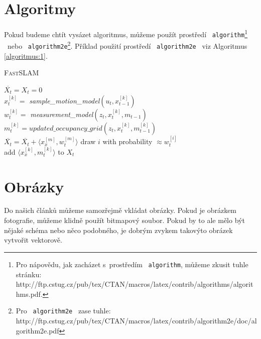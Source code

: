 \documentclass[11pt,a4paper,titlepage]{article}
\begin{document}
\section{Algoritmy} \label{section:3}
Pokud budeme chtít vysázet algoritmus, můžeme použít prostředí \ \texttt{algorithm}\footnote{Pro nápovědu, jak zacházet s~prostředím \ 
\texttt{algorithm}, můžeme zkusit tuhle stránku:\\ http://ftp.cstug.cz/pub/tex/CTAN/macros/latex/contrib/algorithms/algorithms.pdf.}
\ nebo \ \texttt{algorithm2e}\footnote{Pro \ \texttt{algorithm2e} \ zase tuhle: http://ftp.cstug.cz/pub/tex/CTAN/macros/latex/contrib/algorithm2e/doc/algorithm2e.pdf}. Příklad použití prostředí \ \texttt{algorithm2e} \ viz Algoritmus \ref{algoritmus:1}.

\bigskip
\begin{algorithm}[H]
\caption{\textsc{Fast}SLAM}
\label{algoritmus:1}
\SetNlSty{}{}{:}
\SetInd{1em}{1em}
\SetNlSkip{-1.5em}

\BlankLine
\Indp \Indp
    $\overline{X_t} = X_t = 0$\\
    {
        $x_t^{[k]} =$ \emph{sample\_motion\_model}$(u_t,x_{t-1}^{[k]})$\\
        $w_t^{[k]} =$ \emph{measurement\_model}$(z_t,x_t^{[k]},m_{t-1})$\\
        $m_t^{[k]} = updated\_occupancy\_grid(z_t,x_t^{[k]},m_{t-1}^{[k]})$\\
        $\overline{X_t} = \overline{X_t} + \langle x_x^{[m]},w_t^{[m]}\rangle$
    }
    {
        draw $i$ with probability $\approx w_t^{[i]}$\\
        add $\langle x_x^{[k]},m_t^{[k]}\rangle$ to $X_t$\\
    }
\end{algorithm}
\bigskip
\section{Obrázky}
Do našich článků můžeme samozřejmě vkládat obrázky. Pokud je obrázkem fotografie, můžeme klidně použít bitmapový soubor. Pokud by to ale 
mělo být nějaké schéma nebo něco podobného, je dobrým zvykem takovýto obrázek vytvořit vektorově.
\end{document}
